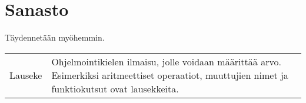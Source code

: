 \section*{Sanasto}


Täydennetään myöhemmin. 

\noindent
\begin{longtable}{@{}p{}p{}@{}}
Lauseke & Ohjelmointikielen ilmaisu, jolle voidaan määrittää arvo. Esimerkiksi aritmeettiset operaatiot, muuttujien nimet ja funktiokutsut ovat lausekkeita. \\
\end{longtable}
